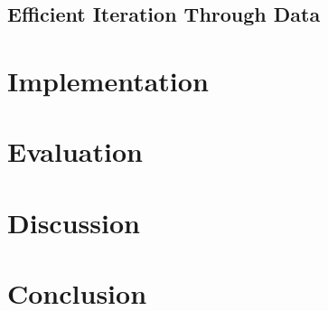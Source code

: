 \subsection{Efficient Iteration Through Data}


\section{Implementation}

\section{Evaluation}

\section{Discussion}

\section{Conclusion}